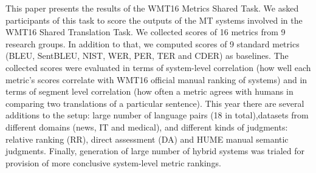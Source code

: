 This paper presents the results of the WMT16 Metrics Shared Task. We asked participants of this task to score the outputs of the MT systems involved in the WMT16 Shared Translation Task. We collected scores of 16 metrics from 9 research groups. In addition to that, we computed scores of 9 standard metrics (BLEU, SentBLEU, NIST, WER, PER, TER and CDER) as baselines. The collected scores were evaluated in terms of system-level correlation (how well each metric's scores correlate with WMT16 official manual ranking of systems) and in terms of segment level correlation (how often a metric agrees with humans in comparing two translations of a particular sentence). This year there are several additions to the setup: large number of language pairs (18 in total),datasets from different domains (news, IT and medical), and different kinds of judgments: relative ranking (RR), direct assessment (DA) and HUME manual semantic judgments. Finally, generation of large number of hybrid systems was trialed for provision of more conclusive system-level metric rankings.
